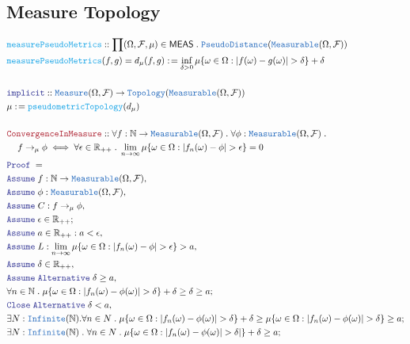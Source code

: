 \documentclass[12pt]{scrartcl}
\newcommand{\TYPE}[1]{\textcolor{NavyBlue}{\mathtt{#1}}}
\newcommand{\FUNC}[1]{\textcolor{Cerulean}{\mathtt{#1}}}
\newcommand{\LOGIC}[1]{\textcolor{Blue}{\mathtt{#1}}}
\newcommand{\THM}[1]{\textcolor{Maroon}{\mathtt{#1}}}
\renewcommand{\.}{\; . \;}
\newcommand{\de}{: \kern 0.1pc =}
\newcommand{\NewLine}{\\ & \kern 1pc}
\newcommand{\Reals}{\mathbb{R} }
\newcommand{\Nat}{\mathbb{N} }
\newcommand{\A}{\LOGIC{Assume} \;}
\newcommand{\Alt}{\LOGIC{Alternative} \;}
\newcommand{\CL}{\LOGIC{Close} \;}
\newcommand{\Proof}{\LOGIC{Proof} \; }
\newcommand{\F}{\mathcal{F}}
\renewcommand{\O}{\Omega}
\begin{document}
\subsection{Measure Topology}
\begin{align*}
  &\FUNC{measurePseudoMetrics} :: \prod (\O,\F,\mu) \in \mathsf{MEAS} \. 
  \TYPE{PseudoDistance}(\TYPE{Measurable}(\O,\F))   \\
 & \FUNC{measurePseudoMetrics}(f,g) = d_\mu (f,g) \de \inf_{\delta > 0} \mu\{ \omega \in \O : |f(\omega) - g(\omega)| > \delta \} + \delta
 \\ \\
 &\LOGIC{implicit} :: \TYPE{Measure}(\O,\F) \to \TYPE{Topology}(\TYPE{Measurable}(\O,\F)) \\
 &  \mu \de \FUNC{pseudometricTopology}(d_\mu)
 \\ \\
 & \THM{ConvergenceInMeasure} :: \forall f : \Nat  \to \TYPE{Measurable}(\O,\F) \. \forall \phi : \TYPE{Measurable} (\O,\F) \. 
\NewLine 
  f \to_\mu \phi   \iff \forall \epsilon \in \Reals_{++} \. \lim_{n \to \infty} 
  \mu\{ \omega \in \O :  |f_n(\omega) - \phi | > \epsilon \} = 0  \\
  & \Proof = \\
  &  \A f : \Nat  \to \TYPE{Measurable}(\O,\F),         \\
  & \A  \phi : \TYPE{Measurable} (\O,\F) , \\
  &  \A C :  f \to_\mu \phi ,   \\ 
  & \A \epsilon \in \Reals_{++}; \\
  &  \A  a \in \Reals_{++} : a < \epsilon,     \\
  &  \A L : \lim_{n \to \infty} 
  \mu\{ \omega \in \O :  |f_n(\omega) - \phi | > \epsilon \} > a,  \\
&   \A \delta \in \Reals_{++},\\
&   \A \Alt \delta \ge a, \\
&   \forall n \in \Nat \. \mu\{ \omega \in \O : |f_n(\omega) - \phi(\omega)| > \delta \} + \delta \ge \delta \ge a ; \\ 
& \CL \Alt \delta < a, \\
&  \exists N : \TYPE{Infinite}(\Nat) . \forall n \in N \. \mu\{ \omega \in \O : |f_n(\omega) - \phi(\omega)| > \delta\} + \delta \ge 
\mu\{ \omega \in \O : |f_n(\omega) - \phi(\omega)| > \delta \}
 \ge a; \\
 & \exists N : \TYPE{Infinite}(\Nat) \. \forall n \in N \. \mu\{ \omega \in \O : |f_n(\omega) - \phi(\omega)| > \delta| \} + \delta \ge a ; \\

\end{align*}
\end{document}
